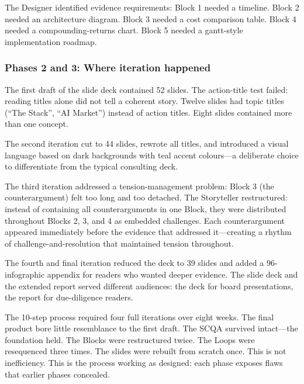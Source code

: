 The Designer identified evidence requirements: Block 1 needed a timeline. Block 2 needed an architecture diagram. Block 3 needed a cost comparison table. Block 4 needed a compounding-returns chart. Block 5 needed a gantt-style implementation roadmap.

\subsubsection{Phases 2 and 3: Where iteration happened}

The first draft of the slide deck contained 52 slides. The action-title test failed: reading titles alone did not tell a coherent story. Twelve slides had topic titles (``The Stack'', ``AI Market'') instead of action titles. Eight slides contained more than one concept.

The second iteration cut to 44 slides, rewrote all titles, and introduced a visual language based on dark backgrounds with teal accent colours---a deliberate choice to differentiate from the typical consulting deck.

The third iteration addressed a tension-management problem: Block 3 (the counterargument) felt too long and too detached. The Storyteller restructured: instead of containing all counterarguments in one Block, they were distributed throughout Blocks 2, 3, and 4 as embedded challenges. Each counterargument appeared immediately before the evidence that addressed it---creating a rhythm of challenge-and-resolution that maintained tension throughout.

The fourth and final iteration reduced the deck to 39 slides and added a 96-infographic appendix for readers who wanted deeper evidence. The slide deck and the extended report served different audiences: the deck for board presentations, the report for due-diligence readers.

\begin{insightbox}
The 10-step process required four full iterations over eight weeks. The final product bore little resemblance to the first draft. The SCQA survived intact---the foundation held. The Blocks were restructured twice. The Loops were resequenced three times. The slides were rebuilt from scratch once. This is not inefficiency. This is the process working as designed: each phase exposes flaws that earlier phases concealed.
\end{insightbox}

